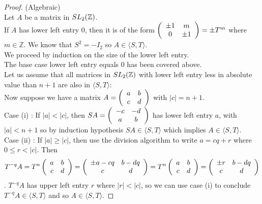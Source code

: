 \begin{proof}{(Algebraic)}\\
Let $A$ be a matrix in $SL_2(\mathbb{Z})$. \\
If $A$ has lower left entry 0, then it is of the form $ \left(\begin{array}{ c c } \pm 1 & m \\ 0 & \pm 1 \end{array} \right) = \pm T^m$ where $m \in \mathbb{Z}$. We know that $S^2 = -I_2$ so $A \in \langle S, T\rangle$. \\
We proceed by induction on the size of the lower left entry.
\\
The base case lower left entry equals 0 has been covered above.
\\
Let us assume that all matrices in $SL_2(\mathbb{Z})$ with lower left entry less in absolute value than $n+1$ are also in $\langle S, T\rangle$:
\\ 
Now suppose we have a matrix $A = \left(\begin{array}{ c c } a & b \\ c & d \end{array} \right)$ with $\vert c \vert  = n +1$.\\
Case (i) : If $\vert a \vert < \vert c \vert$, then $SA  = \left(\begin{array}{ c c }  -c & -d \\ a & b \end{array} \right)$ has lower left entry $a$, with $\vert a \vert < n+1$ so by induction hypothesis $SA \in \langle S, T \rangle$ which implies $A \in \langle S, T \rangle$.\\
Case (ii) : If $\vert a \vert \geq \vert c \vert $, then use the division algorithm to write $a = cq + r$ where $ 0 \leq r < \vert c\vert$. Then 
$$T^{-q}A = T^n\left(\begin{array}{ c c } a & b \\ c & d \end{array} \right) = \left(\begin{array}{ c c }  \pm a -cq & b-dq \\ c & d \end{array} \right) = T^n\left(\begin{array}{ c c } a & b \\ c & d \end{array} \right) = \left(\begin{array}{ c c }  \pm r & b-dq \\ c & d \end{array} \right)$$.
$T^{-q}A$ has upper left entry $r$ where $\vert r \vert < \vert c \vert$, so we can use case (i) to conclude $T^{-q}A \in \langle S, T \rangle$ and so $A \in \langle S , T \rangle$.
\end{proof}

